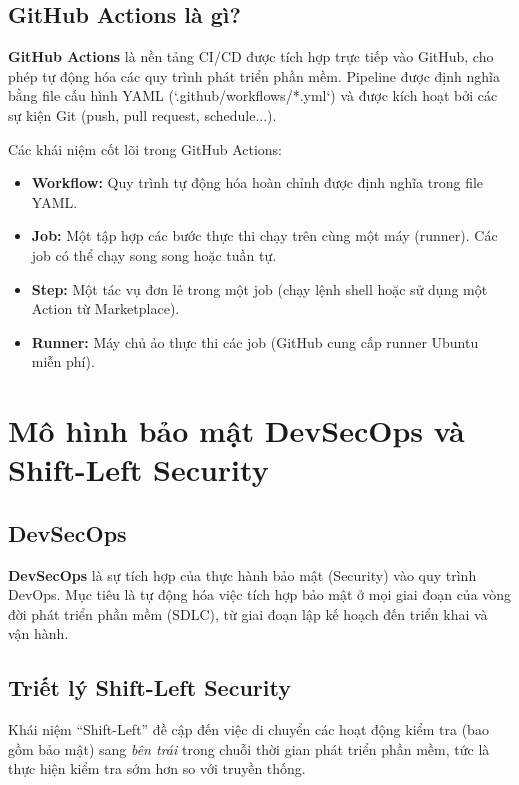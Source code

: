 \documentclass[12pt,a4paper]{report}
\begin{document}
\subsection{GitHub Actions là gì?}

\textbf{GitHub Actions} là nền tảng CI/CD được tích hợp trực tiếp vào GitHub, cho phép tự động hóa các quy trình phát triển phần mềm. Pipeline được định nghĩa bằng file cấu hình YAML (`.github/workflows/*.yml`) và được kích hoạt bởi các sự kiện Git (push, pull request, schedule...).

Các khái niệm cốt lõi trong GitHub Actions:
\begin{itemize}[leftmargin=2cm]
    \item \textbf{Workflow:} Quy trình tự động hóa hoàn chỉnh được định nghĩa trong file YAML.
    \item \textbf{Job:} Một tập hợp các bước thực thi chạy trên cùng một máy (runner). Các job có thể chạy song song hoặc tuần tự.
    \item \textbf{Step:} Một tác vụ đơn lẻ trong một job (chạy lệnh shell hoặc sử dụng một Action từ Marketplace).
    \item \textbf{Runner:} Máy chủ ảo thực thi các job (GitHub cung cấp runner Ubuntu miễn phí).
\end{itemize}

\section{Mô hình bảo mật DevSecOps và Shift-Left Security}

\subsection{DevSecOps}

\textbf{DevSecOps} là sự tích hợp của thực hành bảo mật (Security) vào quy trình DevOps. Mục tiêu là tự động hóa việc tích hợp bảo mật ở mọi giai đoạn của vòng đời phát triển phần mềm (SDLC), từ giai đoạn lập kế hoạch đến triển khai và vận hành.

\subsection{Triết lý Shift-Left Security}

Khái niệm ``Shift-Left'' đề cập đến việc di chuyển các hoạt động kiểm tra (bao gồm bảo mật) sang \textit{bên trái} trong chuỗi thời gian phát triển phần mềm, tức là thực hiện kiểm tra sớm hơn so với truyền thống.
\end{document}
